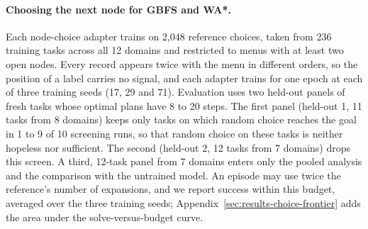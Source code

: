 \paragraph{Choosing the next node for GBFS and WA*.} Each node-choice adapter trains on 2,048 reference choices, taken from 236 training tasks across all 12 domains and restricted to menus with at least two open nodes. Every record appears twice with the menu in different orders, so the position of a label carries no signal, and each adapter trains for one epoch at each of three training seeds (17, 29 and 71). Evaluation uses two held-out panels of fresh tasks whose optimal plans have 8 to 20 steps. The first panel (held-out 1, 11 tasks from 8 domains) keeps only tasks on which random choice reaches the goal in 1 to 9 of 10 screening runs, so that random choice on these tasks is neither hopeless nor sufficient. The second (held-out 2, 12 tasks from 7 domains) drops this screen. A third, 12-task panel from 7 domains enters only the pooled analysis and the comparison with the untrained model. An episode may use twice the reference's number of expansions, and we report success within this budget, averaged over the three training seeds; Appendix~\ref{sec:results-choice-frontier} adds the area under the solve-versus-budget curve.

